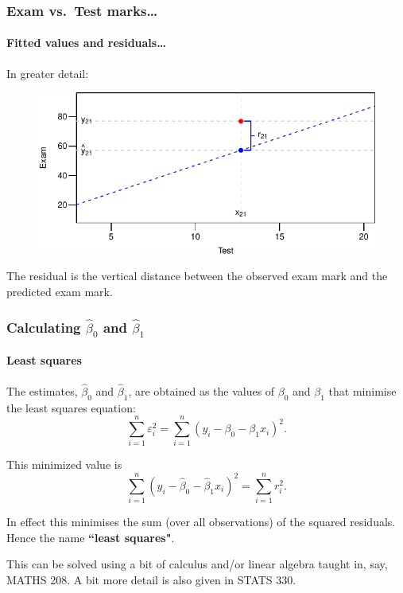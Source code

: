 \documentclass{beamer}\usepackage[]{graphicx}\usepackage[]{xcolor}
\begin{document}
\begin{frame}[fragile]
\frametitle{Exam vs.\ Test marks\ldots}
\framesubtitle{Fitted values and residuals\ldots}

In greater detail:




\begin{figure}
  \centering
  \includegraphics{figure/RC-H02-007}
\end{figure}

The residual is the vertical distance between the observed exam mark and the predicted exam mark.

\end{frame}


\begin{frame}[fragile]
\frametitle{Calculating $\hat{\beta}_0$ and $\hat{\beta}_1$}
\framesubtitle{Least squares}
The estimates, $\hat{\beta}_{0}$ and  $\hat{\beta}_{1}$, are obtained as the values
of $\beta_0$ and $\beta_1$ that minimise the least squares equation:
\[
\sum_{i=1}^{n}\varepsilon_{i}^2=\sum_{i=1}^{n}(y_i-\beta_0-\beta_1 x_i )^2.
\]

This minimized value is
\[
\sum_{i=1}^{n}(y_i-\hat{\beta}_0-\hat{\beta}_1 x_i )^2 = \sum_{i=1}^{n}r_{i}^2.
\]

In  effect this minimises the sum (over all observations) of the squared residuals.
Hence the name \textbf{``least squares"}.

\medskip This can be solved using a bit of calculus and/or linear algebra taught in, say, MATHS 208. A bit more detail is also given in STATS 330.

\end{frame}
\end{document}
